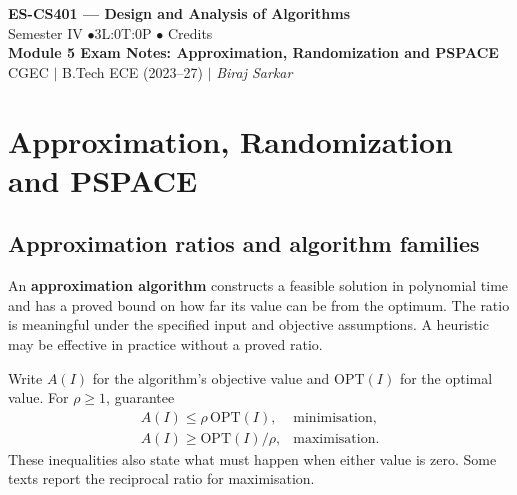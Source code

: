 \documentclass[12pt,a4paper]{article}
\begin{document}
\begin{center}
  {\LARGE\bfseries\color{myred} ES-CS401 --- Design and Analysis of Algorithms}\\[5pt]
  {\normalsize\color{mydark} Semester IV \quad$\bullet$\quad 3L:0T:0P \quad$\bullet$ Credits}\\[3pt]
  {\normalsize\color{myteal}\textbf{Module 5 Exam Notes: Approximation, Randomization and PSPACE}}\\[3pt]
  {\small\color{mydark} CGEC \;$|$\; B.Tech ECE (2023--27) \;$|$\; \textit{Biraj Sarkar}}
\end{center}
\vspace{2pt}
\noindent{\color{myred}\rule{\linewidth}{1.5pt}}
\vspace{2pt}

\hypersetup{linkcolor=mydark}
\tableofcontents
\hypersetup{linkcolor=myteal}
\newpage

\section{Approximation, Randomization and PSPACE}
\subsection{Approximation ratios and algorithm families}
\begin{tcolorbox}[defbox, title={Approximation algorithm}]
An \textbf{approximation algorithm} constructs a feasible solution in polynomial time and has a proved bound on how far its value can be from the optimum. The ratio is meaningful under the specified input and objective assumptions. A heuristic may be effective in practice without a proved ratio.
\end{tcolorbox}

\begin{tcolorbox}[formulabox, title={Ratio convention for nonnegative objectives}]
Write $A(I)$ for the algorithm's objective value and $\mathrm{OPT}(I)$ for the optimal value. For $\rho\ge1$, guarantee
\[
\begin{array}{ll}
A(I)\le\rho\,\mathrm{OPT}(I), & \text{minimisation},\\
A(I)\ge\mathrm{OPT}(I)/\rho, & \text{maximisation}.
\end{array}
\]
These inequalities also state what must happen when either value is zero. Some texts report the reciprocal ratio for maximisation.
\end{tcolorbox}
\end{document}
